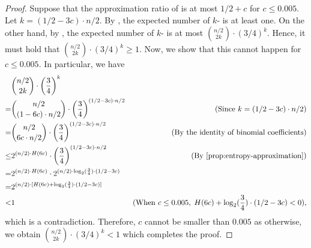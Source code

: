 \begin{proof}
    Suppose that the approximation ratio of \rnk{} is at most $1/2 + c$ for $c \leq 0.005$. Let $k = (1/2 - 3c)\cdot n/2$. By , the expected number of $k$-\wis{} is at least one. On the other hand, by , the expected number of $k$-\wis{} is at most ${n/2 \choose 2k} \cdot (3/4)^k$. Hence, it must hold that ${n/2 \choose 2k} \cdot (3/4)^k \geq 1$. Now, we show that this cannot happen for $c\leq 0.005$. In particular, we have
        \begin{align*}
        &{n/2 \choose 2k} \cdot \left(\frac{3}{4}\right)^k\\
         =& {n/2 \choose (1-6c) \cdot n/2} \cdot \left(\frac{3}{4}\right)^{(1/2 - 3c)\cdot n/2} & (\text{Since } k = (1/2 - 3c)\cdot n/2)\\
        =&{n/2 \choose 6c \cdot n/2} \cdot \left(\frac{3}{4}\right)^{(1/2 - 3c)\cdot n/2} & (\text{By the identity of binomial coefficients})\\
        \leq& 2^{(n/2) \cdot H(6c)} \cdot \left(\frac{3}{4}\right)^{(1/2 - 3c)\cdot n/2} & (\text{By \Cref{prop:entropy-approximation}})\\
        =&2^{(n/2)\cdot H(6c)}\cdot 2^{(n/2)\cdot \log_2(\frac{3}{4})\cdot(1/2 - 3c)}\\
        =&2^{(n/2)\cdot [H(6c)+\log_2(\frac{3}{4})\cdot(1/2 - 3c)]}\\
        <& 1 &(\text{When $c\leq 0.005,\;H(6c)+\log_2(\frac{3}{4})\cdot(1/2 - 3c)<0$}),
    \end{align*}
    which is a contradiction. Therefore, $c$ cannot be smaller than $0.005$ as otherwise, we obtain ${n/2 \choose 2k} \cdot (3/4)^k < 1$ which completes the proof.
\end{proof}